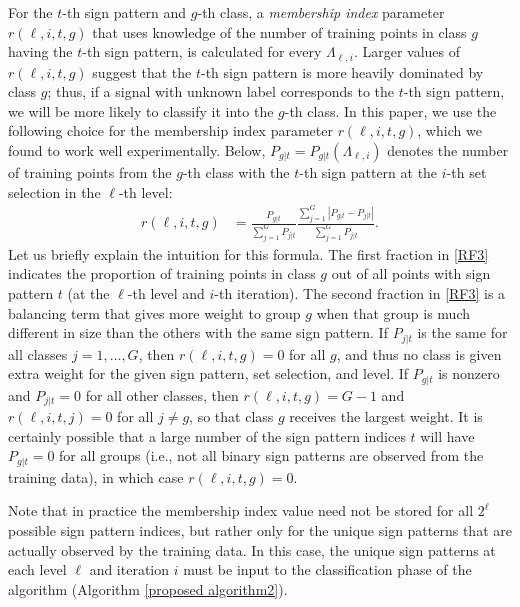 \documentclass[twoside,11pt]{article}
\newcommand{\RF}{membership index\xspace}
\newcommand{\GamLi}[2]{\Lambda_{#1,#2}}  %
\newcommand{\edit}[1]{{{#1}}}
\begin{document}
For the $t$-th sign pattern and $g$-th class, a \textit{\RF} parameter $r(\ell,i,t,g)$ that uses knowledge of the number of training points in class $g$ having the $t$-th sign pattern, is calculated for every $\GamLi{\ell}{i}$. Larger values of  $r(\ell,i,t,g)$ suggest that the $t$-th sign pattern is more heavily dominated by class $g$; thus, if a signal with unknown label corresponds to the $t$-th sign pattern, we will be more likely to classify it into the $g$-th class. In this paper, we use the following choice for the \RF parameter $r(\ell,i,t,g)$, which we found to work well experimentally. Below, $P_{g|t}\edit{ = P_{g|t}(\GamLi{\ell}{i})}$ denotes the number of training points from the $g$-th class with the $t$-th sign pattern at the $i$-th set selection in the $\ell$-th \edit{level}: %
\begin{align} \label{RF3}
r(\ell,i,t,g) &= \frac{P_{g|t}}{\sum_{j=1}^G P_{j|t}} \frac{\sum_{j=1}^G |P_{g|t} - P_{j|t}|}{\sum_{j=1}^G P_{j|t}}.
\end{align}
Let us briefly explain the intuition for this formula. The first fraction in \eqref{RF3} indicates the proportion of training points in class $g$ out of all points with sign pattern $t$ \edit{(at the $\ell$-th level and $i$-th iteration)}. The second fraction in \eqref{RF3} is a balancing term that gives more weight to group $g$ when that group is much different in size than the others with the same sign pattern. 
If $P_{j|t}$ is the same for all classes $j = 1,\dots,G$, then $r(\ell,i,t,g)=0$ for all $g$, and thus no class is given extra weight for the given sign pattern, set selection, and \edit{level}. 
If $P_{g|t}$ is nonzero and $P_{j|t} = 0$ for all other classes, then $r(\ell,i,t,g) = G-1$ 
  and $r(\ell,i,t,j) = 0$ for all $j\neq g$, so that class $g$ receives the largest weight. 
\edit{It is certainly possible that a large number of the sign pattern indices $t$ will have $P_{g|t}=0$ for all groups (i.e., not all binary sign patterns are observed from the training data), in which case $r(\ell,i,t,g) = 0$.}

\edit{
\begin{remark}
Note that in practice the membership index value need not be stored for all $2^\ell$ possible sign pattern indices, but rather only for the unique sign patterns that are actually observed by the training data. In this case, the unique sign patterns at each level $\ell$ and iteration $i$ must be input to the classification phase of the algorithm (Algorithm \ref{proposed algorithm2}). 
\end{remark}}
\end{document}
